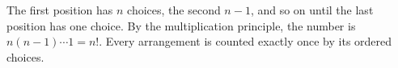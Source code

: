 The first position has $n$ choices, the second $n-1$, and so on until the last position has one choice. By the multiplication principle, the number is $n(n-1)\cdots1=n!$. Every arrangement is counted exactly once by its ordered choices.
